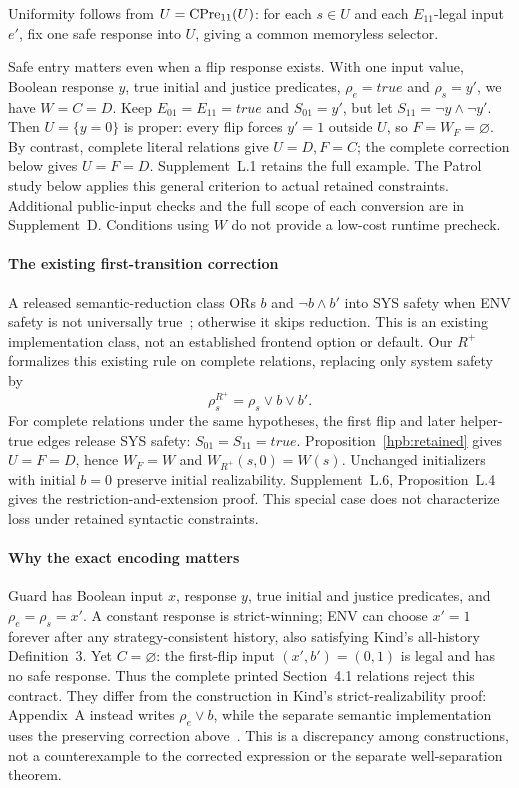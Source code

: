 Uniformity follows from $U=\operatorname{CPre}_{11}(U)$: for each $s\in U$ and
each $E_{11}$-legal input $e'$, fix one safe response into $U$, giving
a common memoryless selector.

Safe entry matters even when a flip response exists. With one input value,
Boolean response $y$, true initial and justice predicates,
$\rho_e=\mathit{true}$ and $\rho_s=y'$, we have $W=C=D$.
Keep $E_{01}=E_{11}=\mathit{true}$ and $S_{01}=y'$, but let
$S_{11}=\neg y\land\neg y'$. Then $U=\{y=0\}$ is proper:
every flip forces $y'=1$ outside $U$, so $F=W_F=\varnothing$.
By contrast, complete literal relations give $U=D,F=C$; the complete
correction below gives $U=F=D$. Supplement~L.1 retains the full example.
The Patrol study below applies this general criterion to actual retained
constraints. Additional public-input checks and the full scope of each
conversion are in Supplement~D. Conditions using $W$ do not provide a
low-cost runtime precheck.

\paragraph{The existing first-transition correction}
A released semantic-reduction class ORs $b$ and $\neg b\land b'$
into SYS safety when ENV safety is not universally true~\cite{spectrarelease2024};
otherwise it skips reduction. This is an existing implementation class,
not an established frontend option or default. Our $R^+$ formalizes this existing rule on complete relations,
replacing only system safety by
\begin{equation}
 \rho_s^{R^+}=\rho_s\lor b\lor b'.
 \label{hpb:corrected}
\end{equation}
For complete relations under the same hypotheses, the first flip and
later helper-true edges release SYS safety: $S_{01}=S_{11}=\mathit{true}$.
Proposition~\ref{hpb:retained} gives $U=F=D$, hence $W_F=W$ and
$W_{R^+}(s,0)=W(s)$. Unchanged initializers with initial $b=0$ preserve
initial realizability. Supplement~L.6, Proposition~L.4 gives the
restriction-and-extension proof.
This special case does not characterize loss under retained syntactic constraints.
\paragraph{Why the exact encoding matters}
Guard has Boolean input $x$, response $y$, true initial and justice
predicates, and $\rho_e=\rho_s=x'$. A constant response is strict-winning;
ENV can choose $x'=1$ forever after any strategy-consistent history,
also satisfying Kind's all-history Definition~3. Yet $C=\varnothing$:
the first-flip input $(x',b')=(0,1)$ is legal and has no safe response.
Thus the complete printed Section~4.1 relations reject this contract.
They differ from the construction in Kind's strict-realizability proof:
Appendix~A instead writes $\rho_e\lor b$, while the separate semantic
implementation uses the preserving correction above~\cite[Theorem~1,
Appendix~A]{kind}. This is a discrepancy among constructions, not a
counterexample to the corrected expression or the separate
well-separation theorem.

